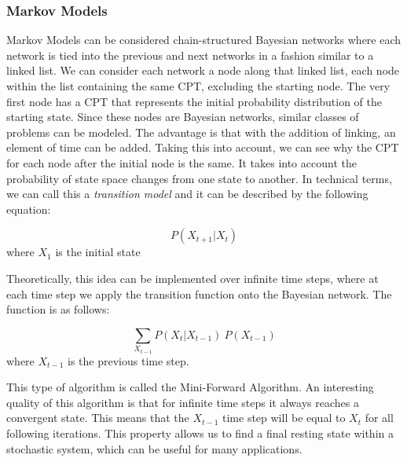 \subsubsection{Markov Models}
Markov Models can be considered chain-structured Bayesian networks where each network is tied into the previous and next networks in a fashion similar to a linked list. We can consider each network a node along that linked list, each node within the list containing the same CPT, excluding the starting node. The very first node has a CPT that represents the initial probability distribution of the starting state. Since these nodes are Bayesian networks, similar classes of problems can be modeled. The advantage is that with the addition of linking, an element of time can be added. Taking this into account, we can see why the CPT for each node after the initial node is the same. It takes into account the probability of state space changes from one state to another. In technical terms, we can call this a \textit{transition model} and it can be described by the following equation:\par

\vspace{-32px}
\begin{center}
  \begin{equation}
    P(X_{t+1}|X_{t})
  \end{equation}
  where $X_{1}$ is the initial state
\end{center}

Theoretically, this idea can be implemented over infinite time steps, where at each time step we apply the transition function onto the Bayesian network. The function is as follows:\par

\vspace{-32px}
\begin{center}
  \begin{equation}
    \sum_{X_{t-1}} P(X_{t}|X_{t-1})\:P(X_{t-1})
  \end{equation}
  where $X_{t-1}$ is the previous time step.
\end{center}

This type of algorithm is called the Mini-Forward Algorithm. An interesting quality of this algorithm is that for infinite time steps it always reaches a convergent state. This means that the $X_{t-1}$ time step will be equal to $X_{t}$ for all following iterations. This property allows us to find a final resting state within a stochastic system, which can be useful for many applications.
